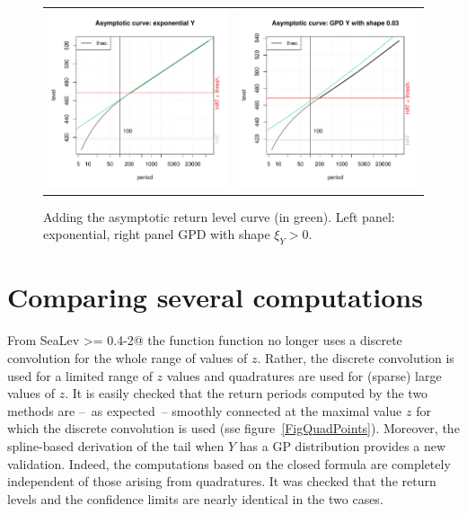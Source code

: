 \documentclass[11pt,a4paper]{report}\usepackage[]{graphicx}\usepackage[]{color}
\newcommand{\pkg}[1]{{\fontseries{b}\selectfont #1}}
\begin{document}
\begin{figure}
  \centering
  \begin{tabular}{c c} 
    \includegraphics[width=7.4cm]{Rgraphics/figBrestAsympt1-1.pdf} &
    \includegraphics[width=7.4cm]{Rgraphics/figBrestAsympt2-1.pdf} 
  \end{tabular}
  \caption{\label{ASYMPT} Adding the asymptotic return level curve (in
    green). Left panel: exponential, right panel GPD with shape
    $\xi_Y>0$.}
\end{figure}

\section{Comparing several computations}
From \pkg{SeaLev} \verb@>= 0.4-2@ the function \verb@convSL@ function
  no longer uses a discrete convolution for the whole range of values
  of $z$. Rather, the discrete convolution is used for a limited range
  of $z$ values and quadratures are used for (sparse) large values of
  $z$. It is easily checked that the return periods computed by the
  two methods are --~as expected~-- smoothly connected at the maximal
  value $z$ for which the discrete convolution is used (sse
  figure~\ref{FigQuadPoints}). Moreover, the spline-based derivation of the tail when $Y$
  has a GP distribution provides a new validation. Indeed, the
  computations based on the closed formula are completely independent
  of those arising from quadratures. It was checked that 
  the return levels and the confidence limits are nearly identical 
  in the two cases.




{%
  \small
  \printindex
}
\end{document}
